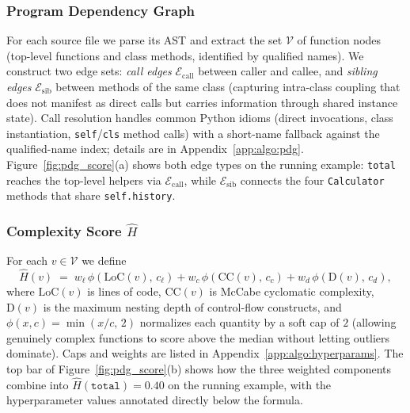 \subsubsection{Program Dependency Graph}
\label{sec:method:pdg}

For each source file we parse its AST and extract the set $\mathcal{V}$
of function nodes (top-level functions and class methods, identified by
qualified names). We construct two edge sets: \emph{call edges}
$\mathcal{E}_{\mathrm{call}}$ between caller and callee, and
\emph{sibling edges} $\mathcal{E}_{\mathrm{sib}}$ between methods of the
same class (capturing intra-class coupling that does not manifest as
direct calls but carries information through shared instance state).
Call resolution handles common Python idioms (direct invocations, class
instantiation, \texttt{self}/\texttt{cls} method calls) with a
short-name fallback against the qualified-name index; details are in
Appendix~\ref{app:algo:pdg}.
Figure~\ref{fig:pdg_score}(a) shows both edge types on the running
example: \texttt{total} reaches the top-level helpers via
$\mathcal{E}_{\mathrm{call}}$, while $\mathcal{E}_{\mathrm{sib}}$
connects the four \texttt{Calculator} methods that share
\texttt{self.history}.

\subsubsection{Complexity Score $\hat{H}$}
\label{sec:method:complexity}

For each $v \in \mathcal{V}$ we define
%
\begin{equation}
  \hat{H}(v) \;=\; w_{\ell}\,\phi\!\left(\mathrm{LoC}(v),\,c_{\ell}\right)
            + w_{c}\,\phi\!\left(\mathrm{CC}(v),\,c_{c}\right)
            + w_{d}\,\phi\!\left(\mathrm{D}(v),\,c_{d}\right),
  \label{eq:complexity}
\end{equation}
%
where $\mathrm{LoC}(v)$ is lines of code, $\mathrm{CC}(v)$ is McCabe
cyclomatic complexity, $\mathrm{D}(v)$ is the maximum nesting depth of
control-flow constructs, and $\phi(x, c) = \min(x / c,\, 2)$ normalizes
each quantity by a soft cap of $2$ (allowing genuinely complex functions
to score above the median without letting outliers dominate). Caps and
weights are listed in Appendix~\ref{app:algo:hyperparams}. The top bar
of Figure~\ref{fig:pdg_score}(b) shows how the three weighted
components combine into $\hat{H}(\texttt{total})\!=\!0.40$ on the
running example, with the hyperparameter values annotated directly
below the formula.

